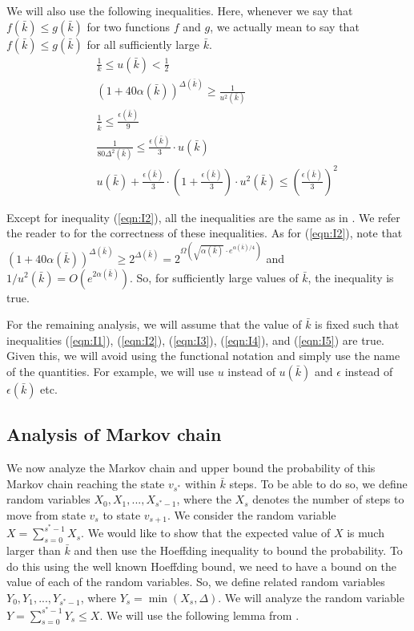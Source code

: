 \documentclass[11pt]{article}
\newcommand{\eps}{{\epsilon}}
\begin{document}
We will also use the following inequalities. Here, whenever we say that $f(\bar{k}) \leq g(\bar{k})$ for two functions $f$ and $g$, we actually mean to say that $f(\bar{k}) \leq g(\bar{k})$ for all sufficiently large $\bar{k}$.
\begin{eqnarray}
&& \frac{1}{k} \leq u(\bar{k}) < \frac{1}{2} \label{eqn:I1}\\
&& (1 + 40 \alpha(\bar{k}))^{\Delta(\bar{k})} \geq \frac{1}{u^2(\bar{k})} \label{eqn:I2}\\
&& \frac{1}{\bar{k}} \leq \frac{\eps(\bar{k})}{9} \label{eqn:I3}\\
&& \frac{1}{80 \Delta^2(\bar{k})} \leq \frac{\eps(\bar{k})}{3} \cdot u(\bar{k}) \label{eqn:I4}\\
&& u(\bar{k}) + \frac{\eps(\bar{k})}{3} \cdot \left( 1 + \frac{\eps(\bar{k})}{3}\right)\cdot u^2(\bar{k}) \leq \left( \frac{\eps(\bar{k})}{3}\right)^2 \label{eqn:I5}
\end{eqnarray}

Except for inequality (\ref{eqn:I2}), all the inequalities are the same as in \cite{br12}. 
We refer the reader to \cite{br12} for the correctness of these inequalities.
As for (\ref{eqn:I2}), note that $(1 + 40 \alpha(\bar{k}))^{\Delta(\bar{k})} \geq 2^{\Delta(\bar{k})} = 2^{\Omega(\sqrt{\alpha(\bar{k})} \cdot e^{\alpha(\bar{k})/4})}$ and $1/u^2(\bar{k}) = O(e^{2\alpha(\bar{k})})$.
So, for sufficiently large values of $\bar{k}$, the inequality is true.

For the remaining analysis, we will assume that the value of $\bar{k}$ is fixed such that inequalities (\ref{eqn:I1}), (\ref{eqn:I2}), (\ref{eqn:I3}), (\ref{eqn:I4}), and (\ref{eqn:I5}) are true. 
Given this, we will avoid using the functional notation and simply use the name of the quantities. For example, we will use $u$ instead of $u(\bar{k})$ and $\eps$ instead of $\eps(\bar{k})$ etc.


\subsection{Analysis of Markov chain}

We now analyze the Markov chain and upper bound the probability of this Markov chain reaching the state $v_{s^*}$ within $\bar{k}$ steps. 
To be able to do so, we define random variables $X_0, X_1, ..., X_{s^*-1}$, where the $X_s$ denotes the number of steps to move from state $v_s$ to state $v_{s+1}$.
We consider the random variable $X = \sum_{s=0}^{s^* - 1} X_s$.
We would like to show that the expected value of $X$ is much larger than $\bar{k}$ and then use the Hoeffding inequality to bound the probability. 
To do this using the well known Hoeffding bound, we need to have a bound on the value of each of the random variables. 
So, we define related random variables $Y_0, Y_1, ..., Y_{s^*-1}$, where $Y_s = \min(X_s, \Delta)$. 
We will analyze the random variable $Y = \sum_{s=0}^{s^*-1} Y_s \leq X$.
We will use the following lemma from \cite{br12}.
\end{document}
